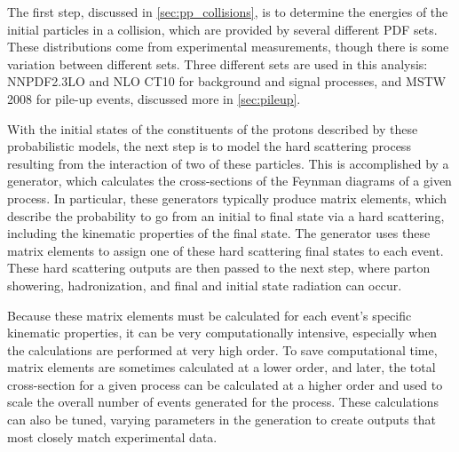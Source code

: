 The first step, discussed in \autoref{sec:pp_collisions}, is to determine the energies of the initial particles in a collision, which are provided by several different \ac{PDF} sets. These distributions come from experimental measurements, though there is some variation between different sets. Three different sets are used in this analysis: NNPDF2.3LO \cite{Ball:2012cx} and NLO CT10 \cite{Lai:2010vv} for background and signal processes, and MSTW 2008 \cite{0901.0002} for pile-up events, discussed more in \autoref{sec:pileup}. 

With the initial states of the constituents of the protons described by these probabilistic models, the next step is to model the hard scattering process resulting from the interaction of two of these particles. This is accomplished by a generator, which calculates the cross-sections of the Feynman diagrams of a given process. In particular, these generators typically produce matrix elements, which describe the probability to go from an initial to final state via a hard scattering, including the kinematic properties of the final state. The generator uses these matrix elements to assign one of these hard scattering final states to each event. These hard scattering outputs are then passed to the next step, where parton showering, hadronization, and final and initial state radiation can occur.

Because these matrix elements must be calculated for each event's specific kinematic properties, it can be very computationally intensive, especially when the calculations are performed at very high order. To save computational time, matrix elements are sometimes calculated at a lower order, and later, the total cross-section for a given process can be calculated at a higher order and used to scale the overall number of events generated for the process. These calculations can also be tuned, varying parameters in the generation to create outputs that most closely match experimental data. 
  

